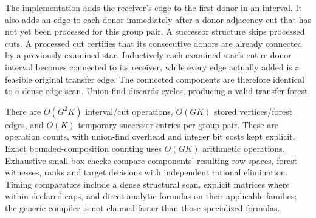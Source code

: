 \documentclass[10pt]{article}
\begin{document}
The implementation adds the receiver's edge to the first donor in an interval.
It also adds an edge to each donor immediately after a donor-adjacency cut that
has not yet been processed for this group pair. A successor structure skips
processed cuts. A processed cut certifies that its consecutive donors are
already connected by a previously examined star. Inductively each examined
star's entire donor interval becomes connected to its receiver, while every
edge actually added is a feasible original transfer edge. The connected
components are therefore identical to a dense edge scan. Union-find discards
cycles, producing a valid transfer forest.

There are $O(G^2K)$ interval/cut operations, $O(GK)$ stored vertices/forest
edges, and $O(K)$ temporary successor entries per group pair. These are operation
counts, with union-find overhead and integer bit costs kept explicit. Exact
bounded-composition counting uses $O(GK)$ arithmetic operations. Exhaustive
small-box checks compare components' resulting row spaces, forest witnesses,
ranks and target decisions with independent rational elimination. Timing
comparators include a dense structural scan, explicit matrices where within
declared caps, and direct analytic formulas on their applicable families; the
generic compiler is not claimed faster than those specialized formulas.
\end{document}
